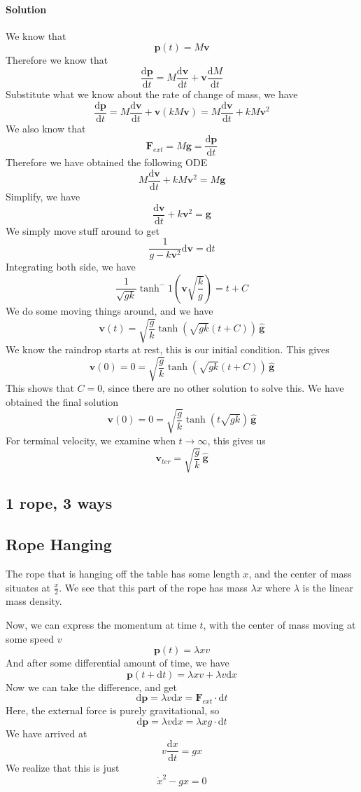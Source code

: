 \documentclass[11pt,letterpaper]{article}
\newcommand{\dydx}[2]{\frac{\text{d} #1}{\text{d} #2}}
\newcommand{\paren}[1]{\left( #1 \right)}
\newcommand{\dfl}{\text{d}}
\begin{document}
\paragraph{Solution}
We know that
\[
\mathbf{p}(t) = M\mathbf{v} 
\]
Therefore we know that
\[
\dydx{\mathbf{p}}{t} = M\dydx{\mathbf{v}}{t}+\mathbf{v}\dydx{M}{t}
\]
Substitute what we know about the rate of change of mass, we have
\[
\dydx{\mathbf{p}}{t} = M\dydx{\mathbf{v}}{t}+\mathbf{v}\paren{kM\mathbf{v}} = M\dydx{\mathbf{v}}{t}+kM\mathbf{v}^2 
\]
We also know that
\[
\mathbf{F}_{ext} = M\mathbf{g} = \dydx{\mathbf{p}}{t} 
\]
Therefore we have obtained the following ODE
\[
M\dydx{\mathbf{v}}{t}+kM\mathbf{v}^2  = M\mathbf{g}
\]
Simplify, we have
\[
\dydx{\mathbf{v}}{t}+k\mathbf{v}^2  = \mathbf{g}
\]
We simply move stuff around to get
\[
\frac{1}{g-k\mathbf{v}^2}\dfl \mathbf{v} = \dfl t
\]
Integrating both side, we have
\[
\frac{1}{\sqrt{gk}}\tanh^-1\paren{\mathbf{v}\sqrt{\frac{k}{g}}} = t+ C
\]
We do some moving things around, and we have
\[
\mathbf{v}(t) = \sqrt{\frac{g}{k}}\tanh\paren{\sqrt{gk}\paren{t+C}}\, \hat{\mathbf{g}}
\]
We know the raindrop starts at rest, this is our initial condition. This gives
\[
\mathbf{v}(0) = 0 = \sqrt{\frac{g}{k}}\tanh\paren{\sqrt{gk}\paren{t+C}}\, \hat{\mathbf{g}}
\]
This shows that $C=0$, since there are no other solution to solve this. We have obtained the final solution
\[
\mathbf{v}(0) = 0 = \sqrt{\frac{g}{k}}\tanh\paren{t\sqrt{gk}}\, \hat{\mathbf{g}}
\]
For terminal velocity, we examine when $t\to\infty$, this gives us
\[
\mathbf{v}_{ter} = \sqrt{\frac{g}{k}}\, \hat{\mathbf{g}}
\]

\subsection{1 rope, 3 ways}
\subsection{Rope Hanging}
The rope that is hanging off the table has some length $x$, and the center of mass situates at $\frac{x}{2}$. We see that this part of the rope has mass $\lambda x$ where $\lambda$ is the linear mass density.

Now, we can express the momentum at time $t$, with the center of mass moving at some speed $v$
\[
\mathbf{p}(t) = \lambda x v
\]
And after some differential amount of time, we have
\[
\mathbf{p}(t+\dfl t) = \lambda x v + \lambda v \dfl x
\]
Now we can take the difference, and get
\[
\dfl \mathbf{p} = \lambda v \dfl x = \mathbf{F}_{ext} \cdot \dfl t
\]
Here, the external force is purely gravitational, so
\[
\dfl \mathbf{p} = \lambda v \dfl x = \lambda x g \cdot \dfl t
\]
We have arrived at
\[
v\dydx{x}{t}= gx
\]
We realize that this is just
\[
\dot{x}^2 - gx = 0
\]
\end{document}
